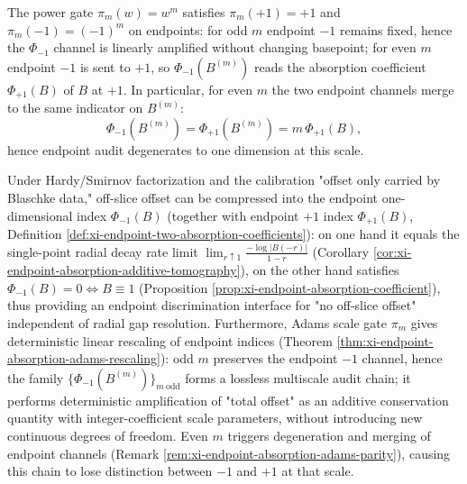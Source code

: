 \begin{remark}\label{rem:xi-endpoint-absorption-adams-parity}
The power gate \(\pi_m(w)=w^m\) satisfies \(\pi_m(+1)=+1\) and \(\pi_m(-1)=(-1)^m\) on endpoints:
for odd \(m\) endpoint \(-1\) remains fixed, hence the \(\Phi_{-1}\) channel is linearly amplified without changing basepoint;
for even \(m\) endpoint \(-1\) is sent to \(+1\), so \(\Phi_{-1}(B^{(m)})\) reads the absorption coefficient \(\Phi_{+1}(B)\) of \(B\) at \(+1\).
In particular, for even \(m\) the two endpoint channels merge to the same indicator on \(B^{(m)}\):
\[
\Phi_{-1}(B^{(m)})=\Phi_{+1}(B^{(m)})=m\,\Phi_{+1}(B),
\]
hence endpoint audit degenerates to one dimension at this scale.
\end{remark}

\begin{remark}\label{rem:xi-endpoint-absorption-terminal-index}
Under Hardy/Smirnov factorization and the calibration "offset only carried by Blaschke data," off-slice offset can be compressed into the endpoint one-dimensional index \(\Phi_{-1}(B)\) (together with endpoint \(+1\) index \(\Phi_{+1}(B)\), Definition \ref{def:xi-endpoint-two-absorption-coefficients}):
on one hand it equals the single-point radial decay rate limit \(\lim_{r\uparrow 1}\frac{-\log|B(-r)|}{1-r}\) (Corollary \ref{cor:xi-endpoint-absorption-additive-tomography}), on the other hand satisfies \(\Phi_{-1}(B)=0\iff B\equiv 1\) (Proposition \ref{prop:xi-endpoint-absorption-coefficient}), thus providing an endpoint discrimination interface for "no off-slice offset" independent of radial gap resolution.
Furthermore, Adams scale gate \(\pi_m\) gives deterministic linear rescaling of endpoint indices (Theorem \ref{thm:xi-endpoint-absorption-adams-rescaling}):
odd \(m\) preserves the endpoint \(-1\) channel, hence the family \(\{\Phi_{-1}(B^{(m)})\}_{m\ \mathrm{odd}}\) forms a lossless multiscale audit chain; it performs deterministic amplification of "total offset" as an additive conservation quantity with integer-coefficient scale parameters, without introducing new continuous degrees of freedom.
Even \(m\) triggers degeneration and merging of endpoint channels (Remark \ref{rem:xi-endpoint-absorption-adams-parity}), causing this chain to lose distinction between \(-1\) and \(+1\) at that scale.
\end{remark}

